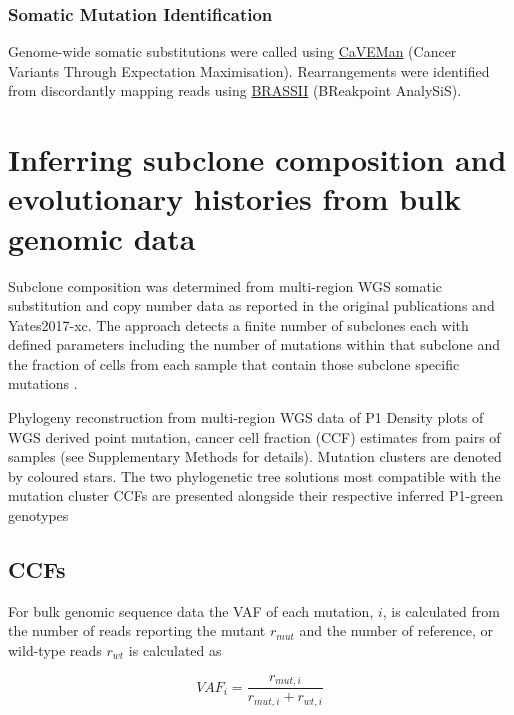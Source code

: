 \subsubsection*{Somatic Mutation Identification}
Genome-wide somatic substitutions were called using \href{http://cancerit.github.io/CaVEMan/}{CaVEMan} (Cancer Variants Through Expectation Maximisation). Rearrangements were identified from discordantly mapping reads using \href{https://github.com/cancerit/BRASS}{BRASSII} (BReakpoint AnalySiS). 

\section{Inferring subclone composition and evolutionary histories from bulk genomic data}
\label{sec:protocol-suppl-evo-history}

Subclone composition was determined from multi-region \ac{WGS} somatic substitution and copy number data as reported in the original publications \textcite{Yates2015-xk} and {Yates2017-xc}. The approach detects a finite number of subclones each with defined parameters including the number of mutations within that subclone and the fraction of cells from each sample that contain those subclone specific mutations .

    {Phylogeny reconstruction from multi-region \acs{WGS} data of P1}
    {Density plots of WGS derived point mutation, cancer cell fraction (CCF) estimates from pairs of samples (see Supplementary Methods for details). Mutation clusters are denoted by coloured stars. The two phylogenetic tree solutions most compatible with the mutation cluster CCFs are presented alongside their respective inferred P1-green genotypes}


\subsection{\aclp{CCF}}

For bulk genomic sequence data the \acf{VAF} of each mutation, $i$, is calculated from the number of reads reporting the mutant $r_{mut}$ and the number of reference, or wild-type reads $r_{wt}$ is calculated as

\begin{equation}
    VAF_i = \frac{r_{mut,i}}{r_{mut,i} + r_{wt,i}}
\end{equation}

